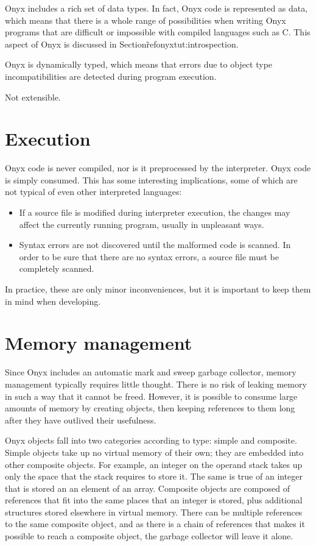 Onyx includes a rich set of data types.  In fact, Onyx code is represented as
data, which means that there is a whole range of possibilities when writing Onyx
programs that are difficult or impossible with compiled languages such as C.
This aspect of Onyx is discussed in Section\~ref{onyxtut:introspection}.

Onyx is dynamically typed, which means that errors due to object type
incompatibilities are detected during program execution.

Not extensible.

\section{Execution}

Onyx code is never compiled, nor is it preprocessed by the interpreter.  Onyx
code is simply consumed.  This has some interesting implications, some of which
are not typical of even other interpreted languages:

\begin{itemize}
\item{If a source file is modified during interpreter execution, the changes may
affect the currently running program, usually in unpleasant ways.}
\item{Syntax errors are not discovered until the malformed code is scanned.  In
order to be sure that there are no syntax errors, a source file must be
completely scanned.}
\end{itemize}

In practice, these are only minor inconveniences, but it is important to keep
them in mind when developing.

\section{Memory management}

Since Onyx includes an automatic mark and sweep garbage collector, memory
management typically requires little thought.  There is no risk of leaking
memory in such a way that it cannot be freed.  However, it is possible to
consume large amounts of memory by creating objects, then keeping references to
them long after they have outlived their usefulness.

Onyx objects fall into two categories according to type: simple and composite.
Simple objects take up no virtual memory of their own; they are embedded into
other composite objects.  For example, an integer on the operand stack takes up
only the space that the stack requires to store it.  The same is true of an
integer that is stored an an element of an array.  Composite objects are
composed of references that fit into the same places that an integer is stored,
plus additional structures stored elsewhere in virtual memory.  There can be
multiple references to the same composite object, and as there is a chain of
references that makes it possible to reach a composite object, the garbage
collector will leave it alone.

